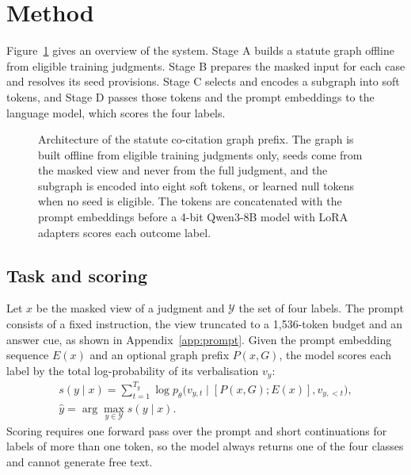 \documentclass[journal]{IEEEtran}
\begin{document}
\section{Method}\label{sec:method}
Figure~\ref{fig:arch} gives an overview of the system. Stage A builds a statute graph offline from eligible training judgments. Stage B prepares the masked input for each case and resolves its seed provisions. Stage C selects and encodes a subgraph into soft tokens, and Stage D passes those tokens and the prompt embeddings to the language model, which scores the four labels.

\begin{figure}[!t]\centering\resizebox{\linewidth}{!}{}
\caption{Architecture of the statute co-citation graph prefix. The graph is built offline from eligible training judgments only, seeds come from the masked view and never from the full judgment, and the subgraph is encoded into eight soft tokens, or learned null tokens when no seed is eligible. The tokens are concatenated with the prompt embeddings before a 4-bit Qwen3-8B model with LoRA adapters scores each outcome label.}\label{fig:arch}\end{figure}

\subsection{Task and scoring}
Let $x$ be the masked view of a judgment and $\mathcal{Y}$ the set of four labels. The prompt consists of a fixed instruction, the view truncated to a 1,536-token budget and an answer cue, as shown in Appendix~\ref{app:prompt}. Given the prompt embedding sequence $E(x)$ and an optional graph prefix $P(x,G)$, the model scores each label by the total log-probability of its verbalisation $v_y$:
\begin{equation}
\begin{gathered}s(y\mid x)=\sum_{t=1}^{T_y}\log p_\theta\bigl(v_{y,t}\mid [P(x,G);E(x)],v_{y,<t}\bigr),\\ \hat y=\arg\max_{y\in\mathcal{Y}}s(y\mid x).\end{gathered}
\end{equation}
Scoring requires one forward pass over the prompt and short continuations for labels of more than one token, so the model always returns one of the four classes and cannot generate free text.
\end{document}
